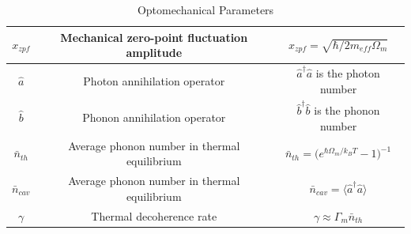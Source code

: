 \documentclass[%
 reprint,
nofootinbib,
 amsmath,amssymb,
 aps,
]{revtex4-2}
\begin{document}
\begin{table}[t]
\begin{tabular}{|c||c|c|}
    \hline
    $x_{zpf}$ & Mechanical zero-point fluctuation amplitude & $x_{zpf} = \sqrt{\hbar / 2 m_{eff} \Omega_m}$ \\
    \hline
    $\hat{a}$ & Photon annihilation operator & $\hat{a}^\dagger \hat{a}$ is the photon number \\
    \hline
    $\hat{b}$ & Phonon annihilation operator & $\hat{b}^\dagger \hat{b}$ is the phonon number \\
    \hline
    $\bar{n}_{th}$ & Average phonon number in thermal equilibrium & $\bar{n}_{th} = \big ( e^{\hbar \Omega_m / k_B T} - 1 \big ) ^ {-1}$ \\
    \hline
    $\bar{n}_{cav}$ & Average phonon number in thermal equilibrium & $\bar{n}_{cav} = \langle \hat{a}^\dagger \hat{a} \rangle $ \\
    \hline
    $\gamma$ & Thermal decoherence rate & $\gamma \approx \Gamma_m \bar{n}_{th}$ \\
    
    \hline
    \end{tabular}
    \caption{Optomechanical Parameters \cite{cavity_optomechanics_2014}}
    \label{tab:Optomechanical Parameters}
\end{table}




\newpage
\nocite{*}

\clearpage







% 
\end{document}
